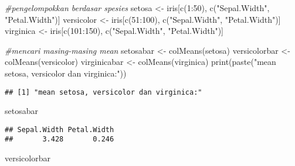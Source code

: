 \documentclass[
]{article}
\newenvironment{Shaded}{\begin{snugshade}}{\end{snugshade}}
\newcommand{\CommentTok}[1]{\textcolor[rgb]{0.56,0.35,0.01}{\textit{#1}}}
\newcommand{\DecValTok}[1]{\textcolor[rgb]{0.00,0.00,0.81}{#1}}
\newcommand{\FunctionTok}[1]{\textcolor[rgb]{0.00,0.00,0.00}{#1}}
\newcommand{\NormalTok}[1]{#1}
\newcommand{\OtherTok}[1]{\textcolor[rgb]{0.56,0.35,0.01}{#1}}
\newcommand{\SpecialCharTok}[1]{\textcolor[rgb]{0.00,0.00,0.00}{#1}}
\newcommand{\StringTok}[1]{\textcolor[rgb]{0.31,0.60,0.02}{#1}}
\begin{document}
\begin{Shaded}
\begin{Highlighting}[]
\CommentTok{\#pengelompokkan berdasar spesies}
\NormalTok{setosa }\OtherTok{\textless{}{-}}\NormalTok{ iris[}\FunctionTok{c}\NormalTok{(}\DecValTok{1}\SpecialCharTok{:}\DecValTok{50}\NormalTok{), }\FunctionTok{c}\NormalTok{(}\StringTok{"Sepal.Width"}\NormalTok{, }\StringTok{"Petal.Width"}\NormalTok{)]}
\NormalTok{versicolor }\OtherTok{\textless{}{-}}\NormalTok{ iris[}\FunctionTok{c}\NormalTok{(}\DecValTok{51}\SpecialCharTok{:}\DecValTok{100}\NormalTok{), }\FunctionTok{c}\NormalTok{(}\StringTok{"Sepal.Width"}\NormalTok{, }\StringTok{"Petal.Width"}\NormalTok{)]}
\NormalTok{virginica }\OtherTok{\textless{}{-}}\NormalTok{ iris[}\FunctionTok{c}\NormalTok{(}\DecValTok{101}\SpecialCharTok{:}\DecValTok{150}\NormalTok{), }\FunctionTok{c}\NormalTok{(}\StringTok{"Sepal.Width"}\NormalTok{, }\StringTok{"Petal.Width"}\NormalTok{)]}

\CommentTok{\#mencari masing{-}masing mean}
\NormalTok{setosabar }\OtherTok{\textless{}{-}} \FunctionTok{colMeans}\NormalTok{(setosa)}
\NormalTok{versicolorbar }\OtherTok{\textless{}{-}} \FunctionTok{colMeans}\NormalTok{(versicolor)}
\NormalTok{virginicabar }\OtherTok{\textless{}{-}} \FunctionTok{colMeans}\NormalTok{(virginica)}
\FunctionTok{print}\NormalTok{(}\FunctionTok{paste}\NormalTok{(}\StringTok{"mean setosa, versicolor dan virginica:"}\NormalTok{))}
\end{Highlighting}
\end{Shaded}

\begin{verbatim}
## [1] "mean setosa, versicolor dan virginica:"
\end{verbatim}

\begin{Shaded}
\begin{Highlighting}[]
\NormalTok{setosabar}
\end{Highlighting}
\end{Shaded}

\begin{verbatim}
## Sepal.Width Petal.Width 
##       3.428       0.246
\end{verbatim}

\begin{Shaded}
\begin{Highlighting}[]
\NormalTok{versicolorbar}
\end{Highlighting}
\end{Shaded}
\end{document}
